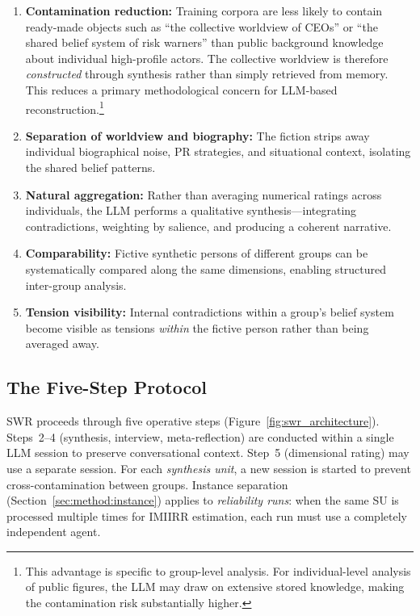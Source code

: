 \documentclass[11pt,a4paper]{article}
\begin{document}
\begin{enumerate}[nosep]
  \item \textbf{Contamination reduction:} Training corpora are less likely to contain ready-made objects such as ``the collective worldview of CEOs'' or ``the shared belief system of risk warners'' than public background knowledge about individual high-profile actors. The collective worldview is therefore \emph{constructed} through synthesis rather than simply retrieved from memory. This reduces a primary methodological concern for LLM-based reconstruction.\footnote{This advantage is specific to group-level analysis. For individual-level analysis of public figures, the LLM may draw on extensive stored knowledge, making the contamination risk substantially higher.}
  \item \textbf{Separation of worldview and biography:} The fiction strips away individual biographical noise, PR strategies, and situational context, isolating the shared belief patterns.
  \item \textbf{Natural aggregation:} Rather than averaging numerical ratings across individuals, the LLM performs a qualitative synthesis---integrating contradictions, weighting by salience, and producing a coherent narrative.
  \item \textbf{Comparability:} Fictive synthetic persons of different groups can be systematically compared along the same dimensions, enabling structured inter-group analysis.
  \item \textbf{Tension visibility:} Internal contradictions within a group's belief system become visible as tensions \emph{within} the fictive person rather than being averaged away.
\end{enumerate}


\subsection{The Five-Step Protocol}
\label{sec:method:protocol}

SWR proceeds through five operative steps (Figure~\ref{fig:swr_architecture}). Steps~2--4 (synthesis, interview, meta-reflection) are conducted within a single LLM session to preserve conversational context. Step~5 (dimensional rating) may use a separate session. For each \emph{synthesis unit}, a new session is started to prevent cross-contamination between groups. Instance separation (Section~\ref{sec:method:instance}) applies to \emph{reliability runs}: when the same SU is processed multiple times for IMIIRR estimation, each run must use a completely independent agent.
\end{document}
